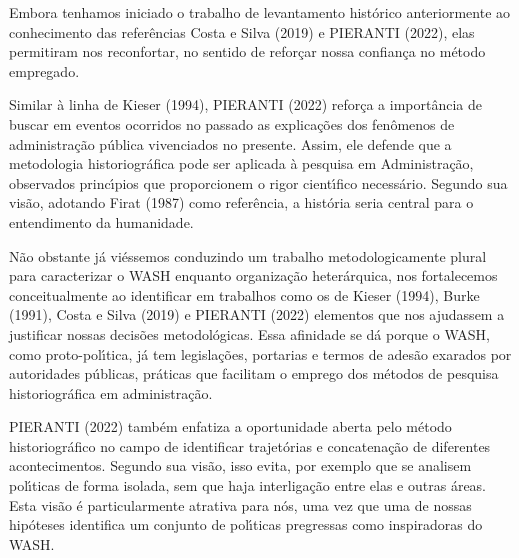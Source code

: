 \documentclass[
12pt,		%
openright,	%
twoside,  %
a4paper,			%
chapter=TITLE,		%
english,			%
french,				%
spanish,			%
brazil				%
]{USPSC-classe/USPSC}
\begin{document}
Embora tenhamos iniciado o trabalho de levantamento hist\'orico anteriormente ao conhecimento das refer\^encias  Costa e Silva (2019) e  PIERANTI (2022), elas permitiram nos reconfortar, no sentido de refor\c{c}ar nossa confian\c{c}a no m\'etodo empregado.









Similar \`a linha de  Kieser (1994),  PIERANTI (2022) refor\c{c}a a import\^ancia de buscar em eventos ocorridos no passado as explica\c{c}\~oes dos fen\^omenos de administra\c{c}\~ao p\'ublica vivenciados no presente. Assim, ele defende que \textquotedbl a metodologia historiogr\'afica pode ser aplicada \`a pesquisa em Administra\c{c}\~ao\textquotedbl , observados princ\'{\i}pios que proporcionem o rigor cient\'{\i}fico necess\'ario. Segundo sua vis\~ao, adotando  Firat (1987) como refer\^encia, a hist\'oria seria \textquotedbl central para o entendimento da humanidade\textquotedbl .









N\~ao obstante j\'a vi\'essemos conduzindo um trabalho metodologicamente plural para caracterizar o WASH enquanto organiza\c{c}\~ao heter\'arquica, nos fortalecemos conceitualmente ao identificar em trabalhos como os de  Kieser (1994),  Burke (1991), Costa e Silva (2019) e PIERANTI (2022) elementos que nos ajudassem a justificar nossas decis\~oes metodol\'ogicas. Essa afinidade se d\'a porque o WASH, como proto-pol\'{\i}tica, j\'a tem legisla\c{c}\~oes, portarias e termos de ades\~ao exarados por autoridades p\'ublicas, pr\'aticas que facilitam o emprego dos m\'etodos de pesquisa historiogr\'afica em administra\c{c}\~ao.









 PIERANTI (2022) tamb\'em enfatiza a oportunidade aberta pelo m\'etodo historiogr\'afico  no campo de identificar trajet\'orias e concatena\c{c}\~ao de diferentes acontecimentos. Segundo sua vis\~ao, \textquotedbl isso evita, por exemplo que se analisem pol\'{\i}ticas de forma isolada, sem que haja interliga\c{c}\~ao entre elas e outras \'areas\textquotedbl . Esta vis\~ao \'e particularmente atrativa para n\'os, uma vez que uma de nossas hip\'oteses identifica um conjunto de pol\'{\i}ticas pregressas como inspiradoras do WASH.
\end{document}
